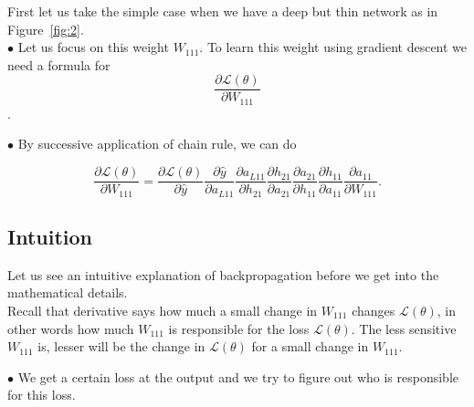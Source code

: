 \documentclass[11pt, a4paper]{article}
\begin{document}
First let us take the simple case when we have a deep but thin network as in Figure~\ref{fig:2}. \\

$\bullet$ Let us focus on this weight $W_{111}$. To learn this weight using gradient descent we need a formula for $$\dfrac{\partial \mathscr{L}(\theta)}{\partial W_{111}}$$.

$\bullet$ By successive application of chain rule, we can do

$$\dfrac{\partial \mathscr{L}(\theta)}{\partial W_{111}} 
= \dfrac{\partial \mathscr{L}(\theta)}{\partial \hat{y}}
  \dfrac{\partial \hat{y}}{\partial a_{L11}}
  \dfrac{\partial a_{L11}}{\partial h_{21}}
  \dfrac{\partial h_{21}}{\partial a_{21}}
  \dfrac{\partial a_{21}}{\partial h_{11}}
  \dfrac{\partial h_{11}}{\partial a_{11}}
  \dfrac{\partial a_{11}}{\partial W_{111}}. $$

\subsection{Intuition}

Let us see an intuitive explanation of backpropagation before we get into the mathematical details. \\

Recall that derivative says how much a small change in $W_{111}$ changes $\mathscr{L}(\theta)$, in other words how much $W_{111}$ is responsible for the loss $\mathscr{L}(\theta)$. The less sensitive $W_{111}$ is, lesser will be the change in $\mathscr{L}(\theta)$ for a small change in $W_{111}$.


$\bullet$ We get a certain loss at the output and we try to figure out who is responsible for this loss.
\end{document}
